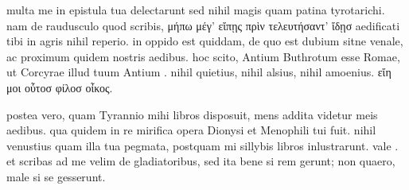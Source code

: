 


 multa me in epistula tua delectarunt sed nihil magis quam patina tyrotarichi. nam de raudusculo quod scribis, μήπω μέγ' εἴπῃς πρὶν τελευτήσαντ' ἴδῃσ aedificati tibi in agris nihil reperio. in oppido est quiddam, de quo est dubium sitne venale, ac proximum quidem nostris aedibus. hoc scito, Antium Buthrotum esse Romae, ut Corcyrae illud tuum Antium . nihil quietius, nihil alsius, nihil amoenius. εἴη μοι οὗτοσ φίλοσ οἶκος.

 postea vero, quam Tyrannio mihi libros disposuit, mens addita videtur meis aedibus. qua quidem in re mirifica opera Dionysi et Menophili tui fuit. nihil venustius quam illa tua pegmata, postquam mi sillybis libros inlustrarunt. vale . et scribas ad me velim de gladiatoribus, sed ita bene si rem gerunt; non quaero, male si se gesserunt.
